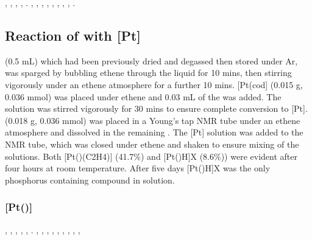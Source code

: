 ,
,
,
,
.
,
,
,
,
,
,
,
,
.


\subsection*{Reaction of \tBuxantphos{} with \texorpdfstring{[Pt]} P}


 (0.5 mL) which had been previously dried and degassed then stored under Ar, was sparged by bubbling ethene through the liquid for 10 mins, then stirring vigorously under an ethene atmosphere for a further 10 mins.  [Pt(cod] (0.015 g, 0.036 mmol) was placed under ethene and 0.03 mL of the  was added.  The solution was stirred vigorously for 30 mins to ensure complete conversion to [Pt].  \tBuxantphos(0.018 g, 0.036 mmol) was placed in a Young's tap NMR tube under an ethene atmosphere and dissolved in the remaining .  The [Pt] solution was added to the NMR tube, which was closed under ethene and shaken to ensure mixing of the solutions.  Both [Pt(\tBuxantphos)\ce({C2H4})] (41.7\%) and [Pt(\tBuxantphos)H]X (8.6\%)) were evident after four hours at room temperature.  After five days [Pt(\tBuxantphos)H]X was the only phosphorus containing compound in solution.

\subsubsection*{[Pt(\tBuxantphos)]}

,
,
,
,
,
.
,
,
,
,
,
,
,
,
,

